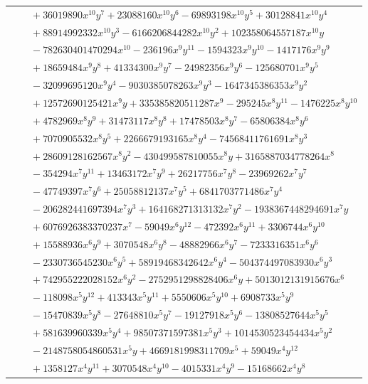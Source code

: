 \documentclass[11pt]{article}
\begin{document}
\begin{longtable}{@{}ll@{}}
 & $\quad +36019890x^{10}y^{7}+23088160x^{10}y^{6}-69893198x^{10}y^{5}+30128841x^{10}y^{4}$\\
 & $\quad +88914992332x^{10}y^{3}-6166206844282x^{10}y^{2}+102358064557187x^{10}y$\\
 & $\quad -782630401470294x^{10}-236196x^{9}y^{11}-1594323x^{9}y^{10}-1417176x^{9}y^{9}$\\
 & $\quad +18659484x^{9}y^{8}+41334300x^{9}y^{7}-24982356x^{9}y^{6}-125680701x^{9}y^{5}$\\
 & $\quad -32099695120x^{9}y^{4}-9030385078263x^{9}y^{3}-1647345386353x^{9}y^{2}$\\
 & $\quad +12572690125421x^{9}y+335385820511287x^{9}-295245x^{8}y^{11}-1476225x^{8}y^{10}$\\
 & $\quad +4782969x^{8}y^{9}+31473117x^{8}y^{8}+17478503x^{8}y^{7}-65806384x^{8}y^{6}$\\
 & $\quad +7070905532x^{8}y^{5}+2266679193165x^{8}y^{4}-74568411761691x^{8}y^{3}$\\
 & $\quad +28609128162567x^{8}y^{2}-430499587810055x^{8}y+3165887034778264x^{8}$\\
 & $\quad -354294x^{7}y^{11}+13463172x^{7}y^{9}+26217756x^{7}y^{8}-23969262x^{7}y^{7}$\\
 & $\quad -47749397x^{7}y^{6}+25058812137x^{7}y^{5}+6841703771486x^{7}y^{4}$\\
 & $\quad -206282441697394x^{7}y^{3}+164168271313132x^{7}y^{2}-1938367448294691x^{7}y$\\
 & $\quad +6076926383370237x^{7}-59049x^{6}y^{12}-472392x^{6}y^{11}+3306744x^{6}y^{10}$\\
 & $\quad +15588936x^{6}y^{9}+3070548x^{6}y^{8}-48882966x^{6}y^{7}-7233316351x^{6}y^{6}$\\
 & $\quad -2330736545230x^{6}y^{5}+58919468342642x^{6}y^{4}-504374497083930x^{6}y^{3}$\\
 & $\quad +742955222028152x^{6}y^{2}-2752951298828406x^{6}y+5013012131915676x^{6}$\\
 & $\quad -118098x^{5}y^{12}+413343x^{5}y^{11}+5550606x^{5}y^{10}+6908733x^{5}y^{9}$\\
 & $\quad -15470839x^{5}y^{8}-27648810x^{5}y^{7}-19127918x^{5}y^{6}-13808527644x^{5}y^{5}$\\
 & $\quad +581639960339x^{5}y^{4}+98507371597381x^{5}y^{3}+1014530523454434x^{5}y^{2}$\\
 & $\quad -2148758054860531x^{5}y+4669181998311709x^{5}+59049x^{4}y^{12}$\\
 & $\quad +1358127x^{4}y^{11}+3070548x^{4}y^{10}-4015331x^{4}y^{9}-15168662x^{4}y^{8}$\\

\end{longtable}
\end{document}

